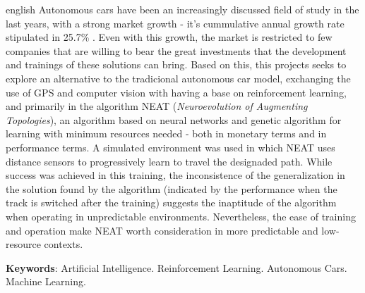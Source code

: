 \begin{resumo}[Abstract]
	\begin{otherlanguage*}{english}
		Autonomous cars have been an increasingly discussed field of study in
		the last years, with a strong market growth - it's cummulative annual
		growth rate stipulated in 25.7\% \cite{globe2022}. Even with this
		growth, the market is restricted to few companies that are willing to
		bear the great investments that the development and trainings of these
		solutions can bring. Based on this, this projects seeks to explore an
		alternative to the tradicional autonomous car model, exchanging the use
		of GPS and computer vision with having a base on reinforcement
		learning, and primarily in the algorithm NEAT (\textit{Neuroevolution
		of Augmenting Topologies}), an algorithm based on neural networks and
		genetic algorithm for learning with minimum resources needed - both in
		monetary terms and in performance terms. A simulated environment was
		used in which NEAT uses distance sensors to progressively learn to
		travel the designaded path. While success was achieved in this
		training, the inconsistence of the generalization in the solution found
		by the algorithm (indicated by the performance when the track is
		switched after the training) suggests the inaptitude of the algorithm
		when operating in unpredictable environments. Nevertheless, the ease of
		training and operation make NEAT worth consideration in more
		predictable and low-resource contexts.

        \vspace{\onelineskip}

        \noindent 
        \textbf{Keywords}: Artificial Intelligence. Reinforcement Learning. Autonomous Cars. Machine Learning.
    \end{otherlanguage*}
\end{resumo}
